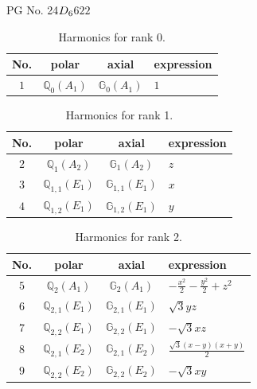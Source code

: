 \documentclass[fleqn,8pt,landscape]{jsarticle}
\begin{document}
\setcounter{MaxMatrixCols}{32}

\renewcommand{\tablename}{Table~}
\renewcommand{\figurename}{Figure~}
\begin{center}
\LARGE
PG No. 24\quad$D_{\rm 6}$\quad$622$\quad[ hexagonal ]
\end{center}
\begin{table}[ht!]
\begin{center}
\caption{Harmonics for rank 0.}
\renewcommand{\arraystretch}{1.3}
\begin{tabular}{cccl} \hline \hline
No. & polar & axial & expression \\ \hline
$ 1 $ & $ \mathbb{Q}_{0}(A_{1}) $ & $ \mathbb{G}_{0}(A_{1}) $ & $ 1 $ \\
 \hline \hline
\end{tabular}
\end{center}
\end{table}
\begin{table}[ht!]
\begin{center}
\caption{Harmonics for rank 1.}
\renewcommand{\arraystretch}{1.3}
\begin{tabular}{cccl} \hline \hline
No. & polar & axial & expression \\ \hline
$ 2 $ & $ \mathbb{Q}_{1}(A_{2}) $ & $ \mathbb{G}_{1}(A_{2}) $ & $ z $ \\
$ 3 $ & $ \mathbb{Q}_{1,1}(E_{1}) $ & $ \mathbb{G}_{1,1}(E_{1}) $ & $ x $ \\
$ 4 $ & $ \mathbb{Q}_{1,2}(E_{1}) $ & $ \mathbb{G}_{1,2}(E_{1}) $ & $ y $ \\
 \hline \hline
\end{tabular}
\end{center}
\end{table}
\begin{table}[ht!]
\begin{center}
\caption{Harmonics for rank 2.}
\renewcommand{\arraystretch}{1.3}
\begin{tabular}{cccl} \hline \hline
No. & polar & axial & expression \\ \hline
$ 5 $ & $ \mathbb{Q}_{2}(A_{1}) $ & $ \mathbb{G}_{2}(A_{1}) $ & $ - \frac{x^{2}}{2} - \frac{y^{2}}{2} + z^{2} $ \\
$ 6 $ & $ \mathbb{Q}_{2,1}(E_{1}) $ & $ \mathbb{G}_{2,1}(E_{1}) $ & $ \sqrt{3} y z $ \\
$ 7 $ & $ \mathbb{Q}_{2,2}(E_{1}) $ & $ \mathbb{G}_{2,2}(E_{1}) $ & $ - \sqrt{3} x z $ \\
$ 8 $ & $ \mathbb{Q}_{2,1}(E_{2}) $ & $ \mathbb{G}_{2,1}(E_{2}) $ & $ \frac{\sqrt{3} \left(x - y\right) \left(x + y\right)}{2} $ \\
$ 9 $ & $ \mathbb{Q}_{2,2}(E_{2}) $ & $ \mathbb{G}_{2,2}(E_{2}) $ & $ - \sqrt{3} x y $ \\
 \hline \hline
\end{tabular}
\end{center}
\end{table}
\end{document}
